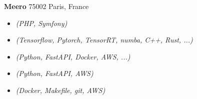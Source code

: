 \documentclass[a4paper]{article}
\newcommand\en[1]{}
\newcommand\fr[1]{}
\begin{document}
    \textbf{Meero}
        \hfill 75002 Paris, France\\
        \en{ \textit{"Backend programmer"} \hfill March 2020 - June 2020\\}
        \fr{ \textit{"Développeur backend"} \hfill mars 2020 - juin 2020\\}
        \vspace{-1mm}
        \begin{itemize} \itemsep 1pt
            \item
                \en{Creation of unit \& functional tests for the Meero platform}
                \fr{Écriture de tests unitaires \& fonctionnels pour la plateform Meero}
                {\sl (PHP, Symfony)}
            \item
                \en{Optimization of image enhancement algorithms written by the R\&D team}
                \fr{Optimisation d’algorithmes d'améliaration d'image écrits par la R\&D}
                {\sl (Tensorflow, Pytorch, TensorRT, numba, C++, Rust, ...)}
            \item
                \en{Integration of algorithms into a micro-services environment}
                \fr{Intégration d’algorithmes dans un système de micro-services}
                {\sl (Python, FastAPI, Docker, AWS, ...)}
            \item
                \en{Work on a custom orchestrator for micro-services}
                \fr{Travail sur un orchestrateur pour gérer les micro-services}
                {\sl (Python, FastAPI, AWS)}
            \item
                \en{Creation of an intuitive and efficient workflow for the R\&D team}
                \fr{Création et mise en place d’un workflow intuitif et efficace pour la R\&D}
                {\sl (Docker, Makefile, git, AWS)}
        \end{itemize}
\end{document}
